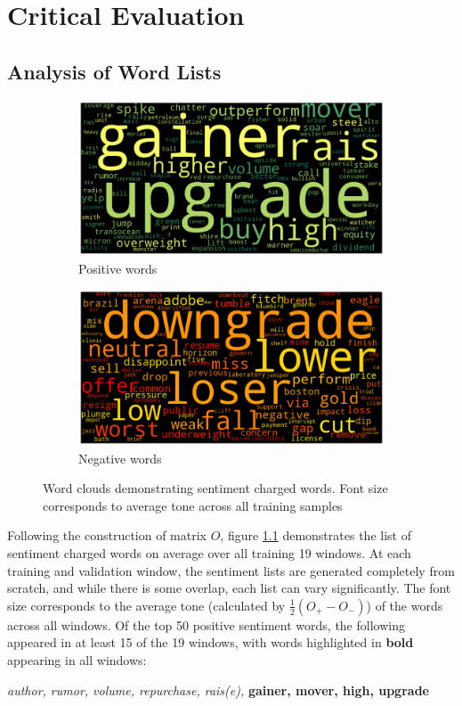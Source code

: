 \chapter{Critical Evaluation}
\label{chap:evaluation}

\section{Analysis of Word Lists}
\begin{figure}[ht]
\begin{subfigure}[b]{\textwidth}
\centering
\includegraphics[scale=0.4]{pics/positive.png}
\caption{Positive words}
\end{subfigure}

\begin{subfigure}[b]{\textwidth}
\centering
\includegraphics[scale=0.4]{pics/negative.png}
\caption{Negative words}
\end{subfigure}
\caption[Word clouds]{Word clouds demonstrating sentiment charged words. Font size corresponds to average tone across all training samples}
\label{wordclouds}
\end{figure}

Following the construction of matrix $O$, figure \ref{wordclouds} demonstrates the list of sentiment charged words on average over all training 19 windows. At each training and validation window, the sentiment lists are generated completely from scratch, and while there is some overlap, each list can vary significantly. The font size corresponds to the average tone (calculated by $\frac{1}{2}(O_+ - O_-)$) of the words across all windows. Of the top 50 positive sentiment words, the following appeared in at least 15 of the 19 windows, with words highlighted in \textbf{bold} appearing in all windows:
\begin{center}
      \textit{author, rumor, volume, repurchase, rais(e),} \textbf{gainer, mover, high, upgrade}
\end{center}

